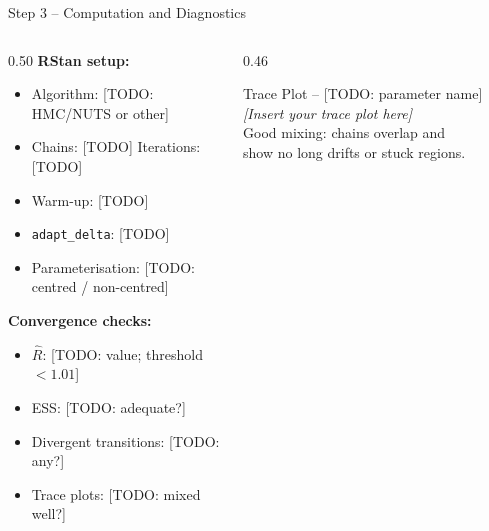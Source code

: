\documentclass[aspectratio=169,11pt]{beamer}
\begin{document}
\begin{frame}{Step 3 -- Computation and Diagnostics}

  \begin{columns}[T]
    \begin{column}{0.50\textwidth}
      \textbf{RStan setup:}
      \begin{itemize}\small
        \item Algorithm: [TODO: HMC/NUTS or other]
        \item Chains: [TODO] \quad Iterations: [TODO]
        \item Warm-up: [TODO]
        \item \texttt{adapt\_delta}: [TODO]
        \item Parameterisation: [TODO: centred / non-centred]
      \end{itemize}
      \vspace{5pt}
      \textbf{Convergence checks:}
      \begin{itemize}\small
        \item $\hat{R}$: [TODO: value; threshold $< 1.01$]
        \item ESS: [TODO: adequate?]
        \item Divergent transitions: [TODO: any?]
        \item Trace plots: [TODO: mixed well?]
      \end{itemize}
    \end{column}
    \begin{column}{0.46\textwidth}
      \begin{block}{Trace Plot -- [TODO: parameter name]}
        \vspace{28pt}
        \centering\small
        \textit{[Insert your trace plot here]}\\
        \tiny
        Good mixing: chains overlap and\\
        show no long drifts or stuck regions.
        \vspace{28pt}
      \end{block}
    \end{column}
  \end{columns}

\end{frame}
\end{document}
